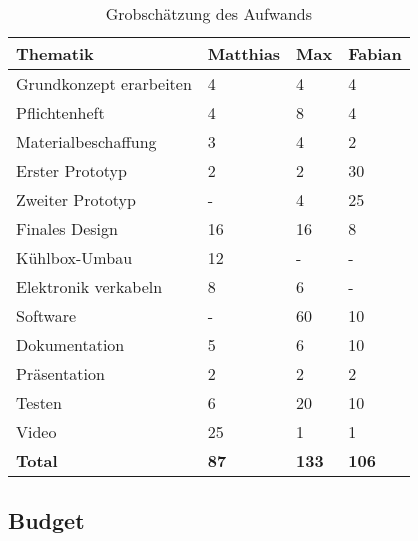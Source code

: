 \begin{table}[H]
    \centering
    \caption{Grobschätzung des Aufwands}
    \label{tab:Aufwand}
    \begin{tabular}{|l|l|l|l|}
    \hline
    \textbf{Thematik}         & \textbf{Matthias} & \textbf{Max} & \textbf{Fabian} \\ \hline
    Grundkonzept   erarbeiten & 4                 & 4            & 4               \\ \hline
    Pflichtenheft             & 4                 & 8            & 4               \\ \hline
    Materialbeschaffung       & 3                 & 4            & 2               \\ \hline
    Erster   Prototyp         & 2                 & 2            & 30              \\ \hline
    Zweiter   Prototyp        & -                 & 4            & 25              \\ \hline
    Finales   Design          & 16                & 16           & 8               \\ \hline
    Kühlbox-Umbau             & 12                & -            & -               \\ \hline
    Elektronik   verkabeln    & 8                 & 6            & -               \\ \hline
    Software                  & -                 & 60           & 10              \\ \hline
    Dokumentation             & 5                 & 6            & 10              \\ \hline
    Präsentation              & 2                 & 2            & 2               \\ \hline
    Testen                    & 6                 & 20           & 10              \\ \hline
    Video                     & 25                & 1            & 1               \\ \hline
    \textbf{Total}            & \textbf{87}       & \textbf{133} & \textbf{106}    \\ \hline
    \end{tabular}
    \end{table}

    \pagebreak

\subsection{Budget}

